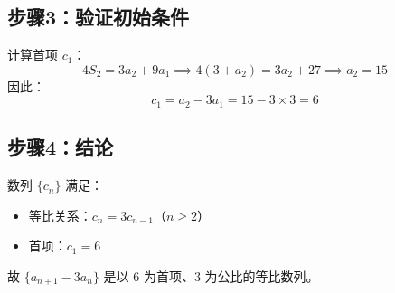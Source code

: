 \documentclass{ctexart}
\begin{document}
\subsection{步骤3：验证初始条件}
计算首项 $c_1$：
\begin{equation*}
    4S_2 = 3a_2 + 9a_1 \implies 4(3 + a_2) = 3a_2 + 27 \implies a_2 = 15
\end{equation*}
因此：
\begin{equation}
    c_1 = a_2 - 3a_1 = 15 - 3 \times 3 = 6
\end{equation}

\subsection{步骤4：结论}
数列 $\{c_n\}$ 满足：
\begin{itemize}
    \item 等比关系：$c_n = 3c_{n-1}$（$n \geq 2$）
    \item 首项：$c_1 = 6$
\end{itemize}
故 $\{a_{n+1} - 3a_n\}$ 是以 $6$ 为首项、$3$ 为公比的等比数列。
\end{document}
